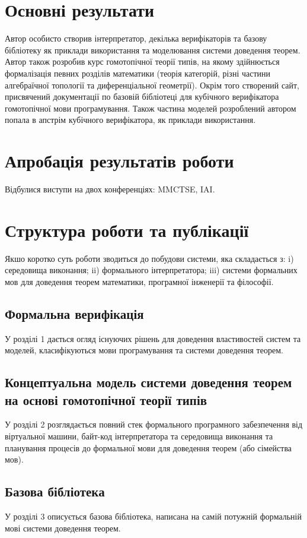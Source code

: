 \section{Основні результати}
Автор особисто створив інтерпретатор, декілька верифікаторів та базову бібліотеку
як приклади використання та моделювання системи доведення теорем. Автор також
розробив курс гомотопічної теорії типів, на якому здійнюється формалізація
певних розділів математики (теорія категорій, різні частини алгебраїчної
топології та диференціальної геометрії). Окрім того створений сайт, присвячений
документації по базовій бібліотеці для кубічного верифікатора гомотопічної мови
програмування. Також частина моделей розроблений автором попала в
апстрім кубічного верифікатора, як приклади використання.

\section{Апробація результатів роботи}
Відбулися виступи на двох конференціях: MMCTSE, IAI.

\section{Структура роботи та публікації}
Якшо коротко суть роботи зводиться до побудови системи, яка складається з:
i) середовища виконання; ii) формального інтерпретатора; iii) системи формальних мов
для доведення теорем математики, програмної інженерії та філософії.

\subsection{Формальна верифікація}

У розділі 1 дається огляд існуючих рішень для доведення
властивостей систем та моделей, класифікуються мови програмування
та системи доведення теорем.

\subsection{Концептуальна модель системи доведення теорем на основі гомотопічної теорії типів}
У розділі 2 розглядається повний стек формального програмного забезпечення
від віртуальної машини, байт-код інтерпретатора та середовища виконання
та планування процесів до формальної мови для доведення теорем (або сімейства мов).

\subsection{Базова бібліотека}
У розділі 3 описується базова бібліотека, написана на самій потужній
формальній мові системи доведення теорем.

